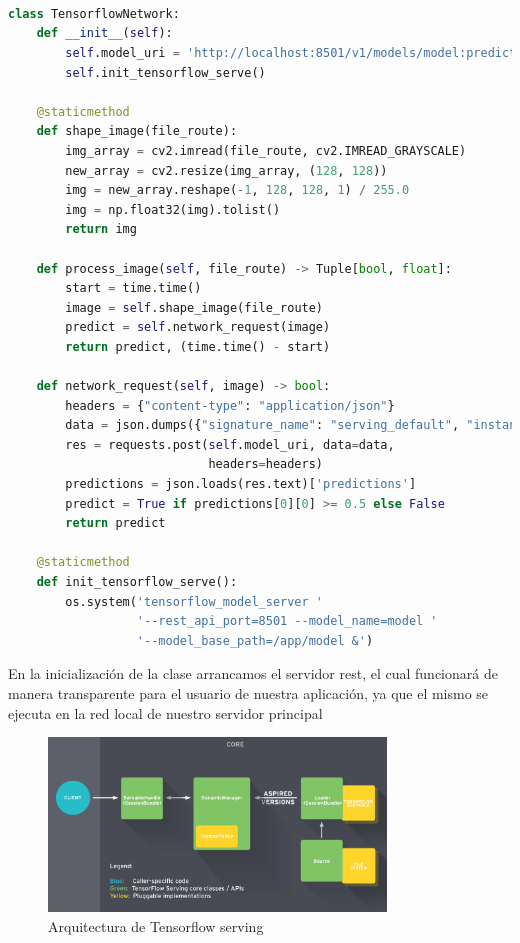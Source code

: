 \begin{lstlisting}[caption=Clase de Tensorflow de la aplicación del trabajo.,
  label=a_label,
  language=python]



class TensorflowNetwork:
    def __init__(self):
        self.model_uri = 'http://localhost:8501/v1/models/model:predict'
        self.init_tensorflow_serve()

    @staticmethod
    def shape_image(file_route):
        img_array = cv2.imread(file_route, cv2.IMREAD_GRAYSCALE)
        new_array = cv2.resize(img_array, (128, 128))
        img = new_array.reshape(-1, 128, 128, 1) / 255.0
        img = np.float32(img).tolist()
        return img

    def process_image(self, file_route) -> Tuple[bool, float]:
        start = time.time()
        image = self.shape_image(file_route)
        predict = self.network_request(image)
        return predict, (time.time() - start)

    def network_request(self, image) -> bool:
        headers = {"content-type": "application/json"}
        data = json.dumps({"signature_name": "serving_default", "instances": image})
        res = requests.post(self.model_uri, data=data,
                            headers=headers)
        predictions = json.loads(res.text)['predictions']
        predict = True if predictions[0][0] >= 0.5 else False
        return predict

    @staticmethod
    def init_tensorflow_serve():
        os.system('tensorflow_model_server '
                  '--rest_api_port=8501 --model_name=model '
                  '--model_base_path=/app/model &')
\end{lstlisting}
En la inicialización de la clase arrancamos el servidor rest, el cual funcionará de manera transparente para el usuario de nuestra aplicación, ya que el mismo se ejecuta en la red
local de nuestro servidor principal


\begin{figure}[h]
    \centering
    \includegraphics[width=0.8\textwidth]{images/chapter3/tf_serving_architecture.png}
    \caption{Arquitectura de Tensorflow serving}
    \label{fig:Arquitectura de Tensorflow serving}
\end{figure}

